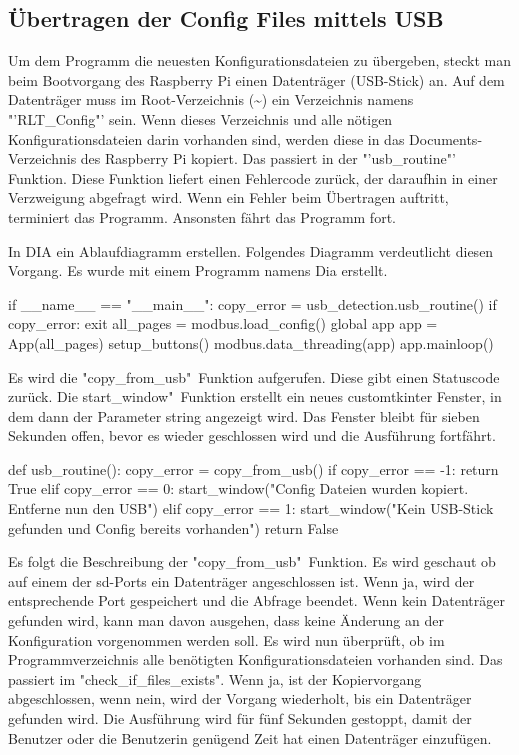 \subsection{Übertragen der Config Files mittels USB}
Um dem Programm die neuesten Konfigurationsdateien zu übergeben, steckt man beim Bootvorgang des Raspberry Pi einen Datenträger (\zB USB-Stick) an. Auf dem Datenträger muss im Root-Verzeichnis (\textasciitilde) ein Verzeichnis namens "'RLT\_Config"' sein. Wenn dieses Verzeichnis und alle nötigen Konfigurationsdateien darin vorhanden sind, werden diese in das Documents-Verzeichnis des Raspberry Pi kopiert. Das passiert in der "'usb\_routine"' Funktion. Diese Funktion liefert einen Fehlercode zurück, der daraufhin in einer Verzweigung abgefragt wird. Wenn ein Fehler beim Übertragen auftritt, terminiert das Programm. Ansonsten fährt das Programm fort.

In DIA ein Ablaufdiagramm erstellen.
Folgendes Diagramm verdeutlicht diesen Vorgang. Es wurde mit einem Programm namens Dia erstellt.


\begin{pythoncode}
if __name__ == "__main__":
	copy_error = usb_detection.usb_routine()
	if copy_error:
		exit
	all_pages = modbus.load_config()
	global app
	app = App(all_pages)
	setup_buttons()
	modbus.data_threading(app)
	app.mainloop()	
\end{pythoncode}

Es wird die "copy\_from\_usb"\ Funktion aufgerufen. Diese gibt einen Statuscode zurück. Die \dq start\_window"\ Funktion erstellt ein neues customtkinter Fenster, in dem dann der Parameter string angezeigt wird. Das Fenster bleibt für sieben Sekunden offen, bevor es wieder geschlossen wird und die Ausführung fortfährt.

\begin{pythoncode}
def usb_routine():
	copy_error = copy_from_usb()
	if copy_error == -1:
		return True
	elif copy_error == 0:
		start_window("Config Dateien wurden kopiert. Entferne nun den USB")   
	elif copy_error == 1: 
		start_window("Kein USB-Stick gefunden und Config bereits vorhanden")  
	return False
\end{pythoncode}

Es folgt die Beschreibung der "copy\_from\_usb"\ Funktion. Es wird geschaut ob auf einem der sd-Ports ein Datenträger angeschlossen ist. Wenn ja, wird der entsprechende Port gespeichert und die Abfrage beendet. Wenn kein Datenträger gefunden wird, kann man davon ausgehen, dass keine Änderung an der Konfiguration vorgenommen werden soll. Es wird nun überprüft, ob im Programmverzeichnis alle benötigten Konfigurationsdateien vorhanden sind. Das passiert im "check\_if\_files\_exists". Wenn ja, ist der Kopiervorgang abgeschlossen, wenn nein, wird der Vorgang wiederholt, bis ein Datenträger gefunden wird. Die Ausführung wird für fünf Sekunden gestoppt, damit der Benutzer oder die Benutzerin genügend Zeit hat einen Datenträger einzufügen.

